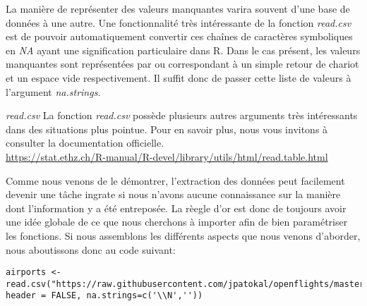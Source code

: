 \noindent
La manière de représenter des valeurs manquantes varira souvent d'une base de données à une autre. Une fonctionnalité très intéressante de la fonction \emph{read.csv} est de pouvoir automatiquement convertir ces chaînes de caractères symboliques en \emph{NA} ayant une signification particulaire dans R. Dans le cas présent, les valeurs manquantes sont représentées par  ou  correspondant à un simple retour de chariot et un espace vide respectivement. Il suffit donc de passer cette liste de valeurs à l'argument \emph{na.strings}. \\

\begin{moreInfo}{\emph{read.csv}}
	La fonction \emph{read.csv} possède plusieurs autres arguments très intéressants dans des situations plus pointue. Pour en savoir plus, nous vous invitons à consulter la documentation officielle. \\
	\url{https://stat.ethz.ch/R-manual/R-devel/library/utils/html/read.table.html}
\end{moreInfo}

\noindent
Comme nous venons de le démontrer, l'extraction des données peut facilement devenir une tâche ingrate si nous n'avons aucune connaissance sur la manière dont l'information y a été entreposée. La rèegle d'or est donc de toujours avoir une idée globale de ce que nous cherchons à importer afin de bien paramétriser les fonctions. Si nous assemblons les différents aspects que nous venons d'aborder, nous aboutissons donc au code suivant:
\begin{lstlisting}[caption = Extraction des données,label=src:Extraction]
	airports <- read.csv("https://raw.githubusercontent.com/jpatokal/openflights/master/data/airports.dat", header = FALSE, na.strings=c('\\N',''))
\end{lstlisting}